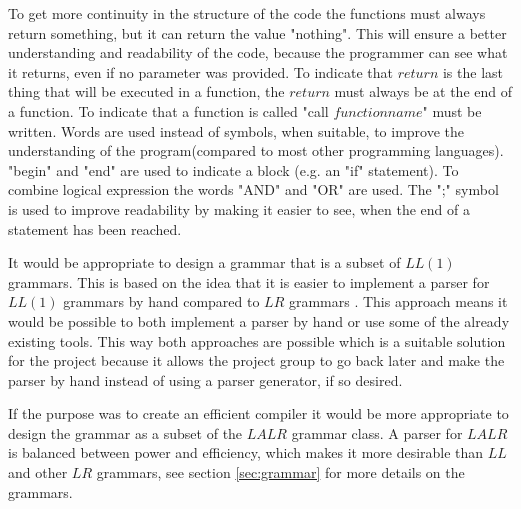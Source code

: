 To get more continuity in the structure of the code the functions must always return something, but it can return the value "nothing". This will ensure a better understanding and readability of the code, because the programmer can see what it returns, even if no parameter was provided. To indicate that $return$ is the last thing that will be executed in a function, the $return$ must always be at the end of a function. To indicate that a function is called "call $functionname$" must be written.
Words are used instead of symbols, when suitable, to improve the understanding of the program(compared to most other programming languages).
"begin" and "end" are used to indicate a block (e.g. an "if" statement). To combine logical expression the words "AND" and "OR" are used. The ";" symbol is used to improve readability by making it easier to see, when the end of a statement has been reached.

It would be appropriate to design a grammar that is a subset of $LL(1)$ grammars. This is based on the idea that it is easier to implement a parser for $LL(1)$ grammars by hand compared to $LR$ grammars \citep{CraftingACompiler}. This approach means it would be possible to both implement a parser by hand or use some of the already existing tools. This way both approaches are possible which is a suitable solution for the project because it allows the project group to go back later and make the parser by hand instead of using a parser generator, if so desired.

If the purpose was to create an efficient compiler it would be more appropriate to design the grammar as a subset of the $LALR$ grammar class. A parser for $LALR$ is balanced between power and efficiency, which makes it more desirable than $LL$ and other $LR$ grammars, see section \ref{sec:grammar} for more details on the grammars. %
